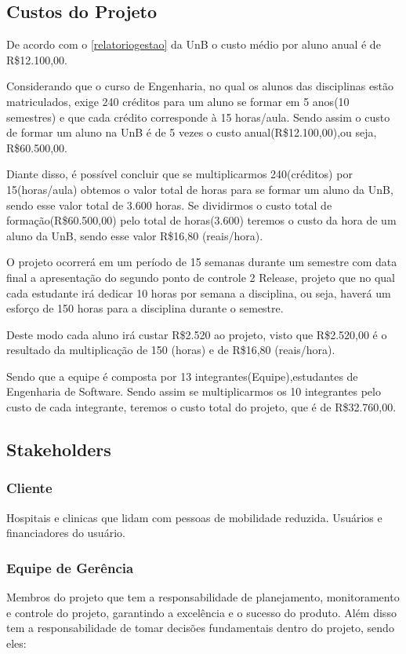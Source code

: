 \subsection{Custos do Projeto}
De acordo com o \ref{relatoriogestao} da UnB o custo médio por aluno 
anual é de R\$12.100,00.

Considerando que o curso de Engenharia, no qual os alunos das 
disciplinas estão matriculados, exige 240 créditos para um aluno se formar em 
5 anos(10 semestres) e que cada crédito corresponde à 15 
horas/aula. Sendo assim o custo de formar um aluno na UnB é de 5 
vezes o custo anual(R\$12.100,00),ou seja, R\$60.500,00.

Diante disso, é possível concluir que se multiplicarmos 240(créditos) por 
15(horas/aula) obtemos o valor total de horas para se formar um aluno da UnB,
sendo esse valor total de 3.600 horas. Se dividirmos o custo total de 
formação(R\$60.500,00) pelo total de horas(3.600) teremos o custo da hora 
de um aluno da UnB, sendo esse valor R\$16,80 (reais/hora).

O projeto ocorrerá em um período de 15 semanas durante um semestre com data 
final a apresentação do segundo ponto de controle 2 Release, projeto que no qual cada estudante irá 
dedicar 10 horas por semana a disciplina, ou seja, haverá um esforço de 150 
horas para a disciplina durante o semestre.

Deste modo cada aluno irá custar R\$2.520 ao projeto, visto que R\$2.520,00 é o 
resultado da multiplicação de 150 (horas) e de R\$16,80 (reais/hora).

Sendo que a equipe é composta por 13 integrantes(Equipe),estudantes de 
Engenharia de Software. Sendo assim se multiplicarmos os 10 integrantes pelo 
custo de cada integrante, teremos o custo total do projeto, que é de 
R\$32.760,00.

\subsection{Stakeholders}

\subsubsection{Cliente}
Hospitais e clinicas que lidam com pessoas de mobilidade reduzida. Usuários e financiadores do usuário.

\subsubsection{Equipe de Gerência}
Membros do projeto que tem a responsabilidade de planejamento, monitoramento 
e controle do projeto, garantindo a excelência e o sucesso do produto. Além 
disso tem a responsabilidade de tomar decisões fundamentais dentro do projeto, 
sendo eles:

